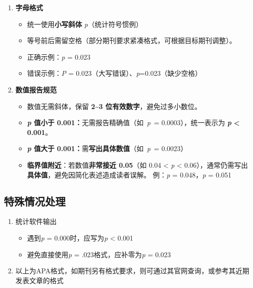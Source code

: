 \documentclass[]{ctexbook}
\providecommand{\tightlist}{%
  \setlength{\itemsep}{0pt}\setlength{\parskip}{0pt}}
\theoremstyle{definition}
\theoremstyle{definition}
\theoremstyle{definition}
\theoremstyle{definition}
\theoremstyle{remark}
\begin{document}
\begin{enumerate}
\def\labelenumi{\arabic{enumi}.}
\tightlist
\item
  \textbf{字母格式}

  \begin{itemize}
  \tightlist
  \item
    统一使用\textbf{小写斜体} \emph{p}（统计符号惯例）
  \item
    等号前后需留空格（部分期刊要求紧凑格式，可根据目标期刊调整）。
  \item
    正确示例：\emph{p} = 0.023
  \item
    错误示例：\emph{P} = 0.023（大写错误）、\emph{p}=0.023（缺少空格）
  \end{itemize}
\item
  \textbf{数值报告规范}

  \begin{itemize}
  \tightlist
  \item
    数值无需斜体，保留 \textbf{2\textasciitilde3 位有效数字}，避免过多小数位。
  \item
    \textbf{\emph{p} 值小于 0.001：}无需报告精确值（如~\emph{p}~= 0.0003），统一表示为 \textbf{\emph{p}} \textbf{\textless{} 0.001}。
  \item
    \textbf{\emph{p} 值大于 0.001：}需\textbf{写出具体数值}（如~\emph{p}~= 0.0023）
  \item
    \textbf{临界值附近}：若数值\textbf{非常接近 0.05}（如 0.04 \textless{} \emph{p} \textless{} 0.06），通常仍需写出\textbf{具体值}，避免因简化表述造成读者误解。 例：\emph{p} = 0.048，\emph{p} = 0.051
  \end{itemize}
\end{enumerate}

\subsection{特殊情况处理}\label{ux7279ux6b8aux60c5ux51b5ux5904ux7406}

\begin{enumerate}
\def\labelenumi{\arabic{enumi}.}
\tightlist
\item
  统计软件输出

  \begin{itemize}
  \tightlist
  \item
    遇到\emph{p} = 0.000时，应写为\emph{p} \textless{} 0.001
  \item
    避免直接使用\emph{p} = .023格式，应补零为\emph{p} = 0.023
  \end{itemize}
\item
  以上为APA格式，如期刊另有格式要求，则可通过其官网查询，或参考其近期发表文章的格式
\end{enumerate}
\end{document}
